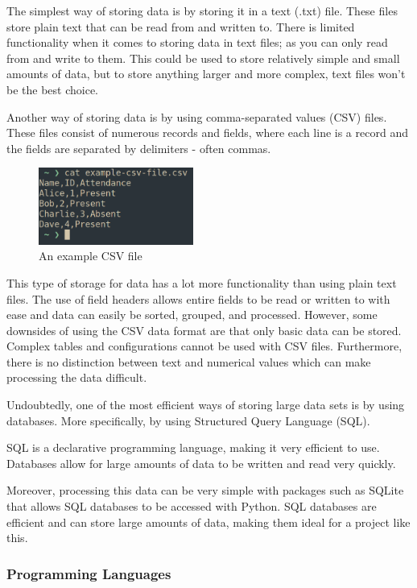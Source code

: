 \documentclass{article}
\begin{document}
The simplest way of storing data is by storing it in a text (.txt) file. These files store plain text that can be read from and written to. There is limited functionality when it comes to storing data in text files; as you can only read from and write to them. This could be used to store relatively simple and small amounts of data, but to store anything larger and more complex, text files won't be the best choice.

Another way of storing data is by using comma-separated values (CSV) files. These files consist of numerous records and fields, where each line is a record and the fields are separated by delimiters  - often commas.

\begin{figure}
    \centering
    \captionsetup{justification=centering}
    \includegraphics[width=2.0in]{example-csv-file}
    \caption{An example CSV file}
\end{figure}

This type of storage for data has a lot more functionality than using plain text files. The use of field headers allows entire fields to be read or written to with ease and data can easily be sorted, grouped, and processed. However, some downsides of using the CSV data format are that only basic data can be stored. Complex tables and configurations cannot be used with CSV files. Furthermore, there is no distinction between text and numerical values which can make processing the data difficult.

 Undoubtedly, one of the most efficient ways of storing large data sets is by using databases. More specifically, by using Structured Query Language (SQL).

SQL is a declarative programming language, making it very efficient to use. Databases allow for large amounts of data to be written and read very quickly.

Moreover, processing this data can be very simple with packages such as SQLite that allows SQL databases to be accessed with Python. SQL databases are efficient and can store large amounts of data, making them ideal for a project like this.

\subsubsection{Programming Languages}
\end{document}

